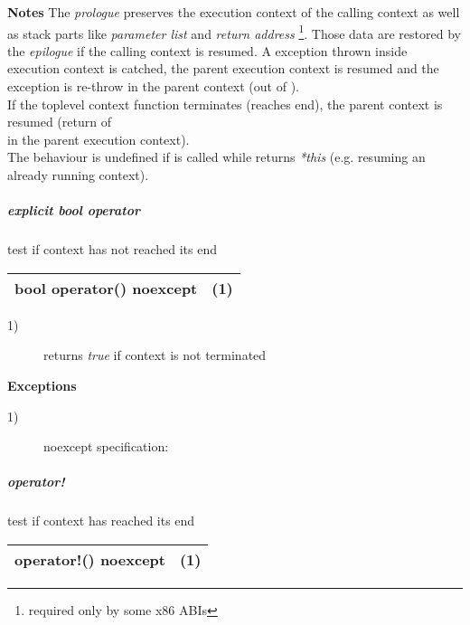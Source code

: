 {\bfseries Notes}
\newline
The \emph{prologue} preserves the execution context of the calling context as well
as stack parts like \emph{parameter list} and \emph{return address}
\footnote{required only by some x86 ABIs}. Those data are restored by the
\emph{epilogue} if the calling context is resumed.
\newline
A exception thrown inside execution context is catched, the parent execution
context is resumed and the exception is re-throw in the parent context (out of
\ectxop).\\
If the toplevel context function terminates (reaches end), the parent context is
resumed (return of\\
\ectxop in the parent execution context).\\
The behaviour is undefined if  is called while 
returns \emph{*this} (e.g. resuming an already running context).

\subparagraph*{explicit bool operator}
test if context has not reached its end\\

\begin{tabular}{ l l }
    \midrule

    {\ttfamily\small\color{black}{\color{blue}explicit} {\color{blue}bool} {\color{blue}operator}() {\color{blue}noexcept}} & (1)\\

    \midrule
\end{tabular}

\begin{description}
    \item[1)] returns \emph{true} if context is not terminated\\
\end{description}

{\bfseries Exceptions}
\begin{description}
    \item[1)] noexcept specification: \\
\end{description}

\subparagraph*{operator!}
test if context has reached its end\\

\begin{tabular}{ l l }
    \midrule

    {\ttfamily\small\color{black}{\color{blue}bool} {\color{blue}operator}!() {\color{blue}noexcept}} & (1)\\

    \midrule
\end{tabular}

